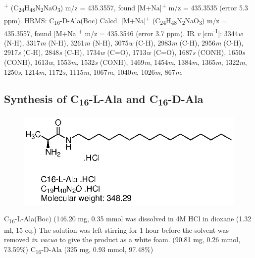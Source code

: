 \newline
[M+Na]\textsuperscript{+} (C\textsubscript{24}H\textsubscript{48}N\textsubscript{2}NaO\textsubscript{3}) m/z = 435.3557, found [M+Na]\textsuperscript{+} m/z = 435.3535 (error 5.3 ppm).
\newline
HRMS: C\textsubscript{16}-D-Ala(Boc) Calcd. [M+Na]\textsuperscript{+} (C\textsubscript{24}H\textsubscript{48}N\textsubscript{2}NaO\textsubscript{3}) m/z = 435.3557, found [M+Na]\textsuperscript{+} m/z = 435.3546 (error 3.7 ppm).
\newline
IR \textit{v} [cm\textsuperscript{-1}]: 3344\textit{w} (N-H), 3317\textit{m} (N-H), 3261\textit{m} (N-H), 3075\textit{w} (C-H), 2983\textit{m} (C-H), 2956\textit{m} (C-H), 2917\textit{s} (C-H), 2848\textit{s} (C-H), 1734\textit{w} (C=O), 1713\textit{w} (C=O), 1687\textit{s} (CONH), 1650\textit{s} (CONH), 1613\textit{w}, 1553\textit{m}, 1532\textit{s} (CONH), 1469\textit{m}, 1454\textit{m}, 1384\textit{m}, 1365\textit{m}, 1322\textit{m}, 1250\textit{s}, 1214\textit{m}, 1172\textit{s}, 1115\textit{m}, 1067\textit{m}, 1040\textit{m}, 1026\textit{m}, 867\textit{m}. 

\newpage
\subsection*{Synthesis of C\textsubscript{16}-L-Ala and C\textsubscript{16}-D-Ala}
\begin{figure}[h!]
\centering
\includegraphics{Figures/C16-L-Ala.eps}
\end{figure}
C\textsubscript{16}-L-Ala(Boc) (146.20 mg, 0.35 mmol was dissolved in 4M HCl in dioxane (1.32 ml, 15 eq.) The solution was left stirring for 1 hour before the solvent was removed \textit{in vacuo} to give the product as a white foam. (90.81 mg, 0.26 mmol, 73.59\%) C\textsubscript{16}-D-Ala (325 mg, 0.93 mmol, 97.48\%)


